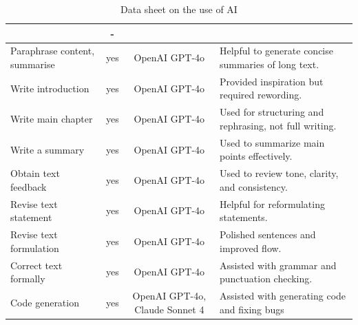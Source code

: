\documentclass[a4paper,12pt,twoside]{scrreprt}
\begin{document}
\begin{table}[h]
{\begin{tabular}{|p{4cm}|c|c|p{7cm}|}
                                               & -
      \\
      \hline
      Paraphrase content, summarise            & yes
                                               & OpenAI GPT-4o
                                               & Helpful to generate
      concise summaries of long text.
      \\
      \hline
      Write introduction                       & yes
                                               & OpenAI GPT-4o
                                               & Provided inspiration but
      required rewording.
      \\
      \hline
      Write main chapter                       & yes
                                               & OpenAI GPT-4o
                                               & Used for structuring and
      rephrasing, not full writing.
      \\
      \hline
      Write a summary                          & yes
                                               & OpenAI GPT-4o
                                               & Used to summarize main points
      effectively.
      \\
      \hline
      Obtain text feedback                     & yes
                                               & OpenAI GPT-4o
                                               & Used to review tone, clarity,
      and consistency.
      \\
      \hline
      Revise text statement                    & yes
                                               & OpenAI GPT-4o
                                               & Helpful for reformulating
      statements.
      \\
      \hline
      Revise text formulation                  & yes
                                               & OpenAI GPT-4o
                                               & Polished sentences and
      improved flow.
      \\
      \hline
      Correct text formally                    & yes
                                               & OpenAI GPT-4o
                                               & Assisted with grammar and
      punctuation checking.
      \\
      \hline
      Code generation                          & yes
                                               & OpenAI GPT-4o, Claude Sonnet 4
                                               & Assisted with generating code
      and fixing bugs
      \\
      \hline
    \end{tabular}%
  }
  \caption{Data sheet on the use of AI}
\end{table}
\end{document}
